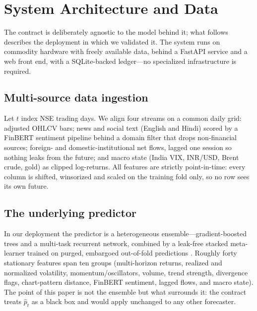 \documentclass[conference]{IEEEtran}
\begin{document}
\section{System Architecture and Data}
\label{sec:system}
The contract is deliberately agnostic to the model behind it; what follows
describes the deployment in which we validated it. The system runs on commodity
hardware with freely available data, behind a FastAPI service and a web front end,
with a SQLite-backed ledger---no specialized infrastructure is required.

\subsection{Multi-source data ingestion}
Let $t$ index NSE trading days. We align four streams on a common daily grid:
adjusted OHLCV bars; news and social text (English and Hindi) scored by a FinBERT
sentiment pipeline \cite{araci} behind a domain filter that drops non-financial
sources; foreign- and domestic-institutional net flows, lagged one session so
nothing leaks from the future; and macro state (India VIX, INR/USD, Brent crude,
gold) as clipped log-returns. All features are strictly point-in-time: every
column is shifted, winsorized and scaled on the training fold only, so no row sees
its own future.

\subsection{The underlying predictor}
In our deployment the predictor is a heterogeneous ensemble---gradient-boosted
trees \cite{chen2016,ke2017,prokhorenkova2018} and a multi-task recurrent network,
combined by a leak-free stacked meta-learner \cite{wolpert1992} trained on purged,
embargoed out-of-fold predictions \cite{lopezdeprado2018}. Roughly forty stationary
features span ten groups (multi-horizon returns, realized and normalized
volatility, momentum/oscillators, volume, trend strength, divergence flags,
chart-pattern distance, FinBERT sentiment, lagged flows, and macro state). The
point of this paper is not the ensemble but what surrounds it: the contract treats
$\hat p_t$ as a black box and would apply unchanged to any other forecaster.
\end{document}
